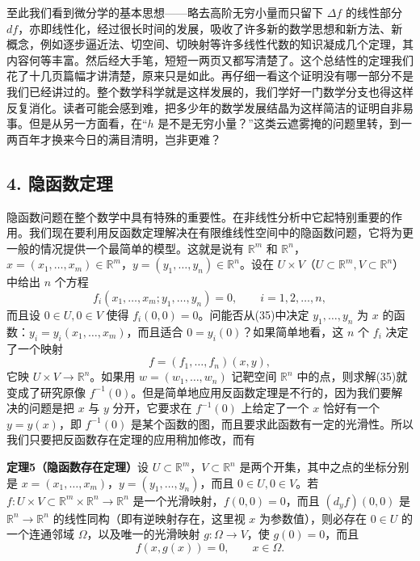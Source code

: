 至此我们看到微分学的基本思想——略去高阶无穷小量而只留下 $\Delta f$ 的线性部分 $df$，亦即线性化，经过很长时间的发展，吸收了许多新的数学思想和新方法、新概念，例如逐步逼近法、切空间、切映射等许多线性代数的知识凝成几个定理，其内容何等丰富。然后经大手笔，短短一两页又都写清楚了。这个总结性的定理我们花了十几页篇幅才讲清楚，原来只是如此。再仔细一看这个证明没有哪一部分不是我们已经讲过的。整个数学科学就是这样发展的，我们学好一门数学分支也得这样反复消化。读者可能会感到难，把多少年的数学发展结晶为这样简洁的证明自非易事。但是从另一方面看，在“$h$ 是不是无穷小量？”这类云遮雾掩的问题里转，到一两百年才换来今日的满目清明，岂非更难？

\subsection*{4. 隐函数定理}

隐函数问题在整个数学中具有特殊的重要性。在非线性分析中它起特别重要的作用。我们现在要利用反函数定理解决在有限维线性空间中的隐函数问题，它将为更一般的情况提供一个最简单的模型。这就是说有 $\mathbb R^m$ 和 $\mathbb R^n$，$x=(x_1,\ldots,x_m)\in\mathbb R^m$，$y=(y_1,\ldots,y_n)\in\mathbb R^n$。设在 $U\times V$（$U\subset\mathbb R^m,V\subset\mathbb R^n$）中给出 $n$ 个方程
\begin{equation}
 f_i(x_1,\ldots,x_m;y_1,\ldots,y_n)=0,
 \qquad i=1,2,\ldots,n,
 \tag{35}
\end{equation}
而且设 $0\in U,0\in V$ 使得 $f_i(0,0)=0$。问能否从(35)中决定 $y_1,\ldots,y_n$ 为 $x$ 的函数：$y_i=y_i(x_1,\ldots,x_m)$，而且适合 $0=y_i(0)$？如果简单地看，这 $n$ 个 $f_i$ 决定了一个映射
\[
 f=(f_1,\ldots,f_n)(x,y),
\]
它映 $U\times V\to\mathbb R^n$。如果用 $w=(w_1,\ldots,w_n)$ 记靶空间 $\mathbb R^n$ 中的点，则求解(35)就变成了研究原像 $f^{-1}(0)$。但是简单地应用反函数定理是不行的，因为我们要解决的问题是把 $x$ 与 $y$ 分开，它要求在 $f^{-1}(0)$ 上给定了一个 $x$ 恰好有一个 $y=y(x)$，即 $f^{-1}(0)$ 是某个函数的图，而且要求此函数有一定的光滑性。所以我们只要把反函数存在定理的应用稍加修改，而有

\noindent\textbf{定理5（隐函数存在定理）}\quad 设 $U\subset\mathbb R^m$，$V\subset\mathbb R^n$ 是两个开集，其中之点的坐标分别是 $x=(x_1,\ldots,x_m)$，$y=(y_1,\ldots,y_n)$，而且 $0\in U,0\in V$。若 $f:U\times V\subset\mathbb R^m\times\mathbb R^n\to\mathbb R^n$ 是一个光滑映射，$f(0,0)=0$，而且 $(d_yf)(0,0)$ 是 $\mathbb R^n\to\mathbb R^n$ 的线性同构（即有逆映射存在，这里视 $x$ 为参数值），则必存在 $0\in U$ 的一个连通邻域 $\Omega$，以及唯一的光滑映射 $g:\Omega\to V$，使 $g(0)=0$，而且
\begin{equation}
 f(x,g(x))=0,
 \qquad x\in\Omega.
 \tag{36}
\end{equation}

